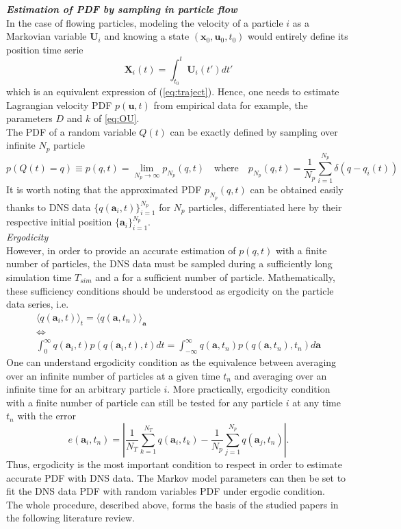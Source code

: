 \textbf{\textit{Estimation of PDF by sampling in particle flow}}\\
In the case of flowing particles, modeling the velocity of a particle $i$ as a Markovian variable $\textbf{U}_i$ and knowing a state $(\textbf{x}_0,\textbf{u}_0,t_0)$ would entirely define its position time serie 
\[\textbf{X}_i(t)=\int_{t_0}^{t}\textbf{U}_i(t')dt'\]
which is an equivalent expression of (\ref{eq:traject}).
Hence, one needs to estimate Lagrangian velocity PDF $p(\textbf{u},t)$ from empirical data for example, the parameters $D$ and $k$ of \eqref{eq:OU}. 
\\The PDF of a random variable $Q(t)$ can be exactly defined by sampling over infinite $N_p$ particle
\[
p(Q(t)=q)\equiv p(q,t)=\lim\limits_{N_p\rightarrow\infty}p_{N_p}(q,t) \quad\textrm{where}\quad p_{N_p}(q,t)=\frac{1}{N_p}\sum_{i=1}^{N_p}\delta(q-q_i(t))
\]
It is worth noting that the approximated PDF $p_{N_p}(q,t)$ can be obtained easily thanks to DNS data $\{q(\textbf{a}_i,t)\}_{i=1}^{N_p}$ for $N_p$ particles, differentiated here by their respective initial position $\{\textbf{a}_i\}_{i=1}^{N_p}$.\\
\textit{Ergodicity}\\
However, in order to provide an accurate estimation of $p(q,t)$ with a finite number of particles, the DNS data 
must be sampled during a sufficiently long simulation time $T_{sim}$ and a for a sufficient number of particle. 
Mathematically, these sufficiency conditions should be understood as ergodicity on the particle data series, i.e.
\begin{equation}
\begin{array}{c}
	\langle q(\textbf{a}_i,t)\rangle_t = \langle q(\textbf{a},t_n)\rangle_{\textbf{a}}\\
	\Leftrightarrow\\
	\int_{0}^{\infty}q(\textbf{a}_i,t) p(q(\textbf{a}_i,t),t)dt=\int_{-\infty}^{\infty}q(\textbf{a},t_n)p(q(\textbf{a},t_n),t_n)d\textbf{a}
\end{array}
\label{eq:ergodicity}
\end{equation}
One can understand ergodicity condition as the equivalence between averaging over an infinite number of particles at a given time $t_n$ and averaging over an infinite time for an arbitrary particle $i$. 
More practically, ergodicity condition with a finite number of particle can still be tested for any particle $i$ at any time $t_n$ with the error
\begin{equation}\label{eq:ergo_err}
	e(\textbf{a}_i,t_n)=|\frac{1}{N_T}\sum_{k=1}^{N_T}q(\textbf{a}_i,t_k)-\frac{1}{N_p}\sum_{j=1}^{N_p}q(\textbf{a}_j,t_n)|.
\end{equation}
Thus, ergodicity is the most important condition to respect in order to estimate accurate PDF with DNS data. The Markov model parameters can then be set to fit the DNS data PDF with random variables PDF under ergodic condition.\\
The whole procedure, described above, forms the basis of the studied papers in the following literature review.\\

